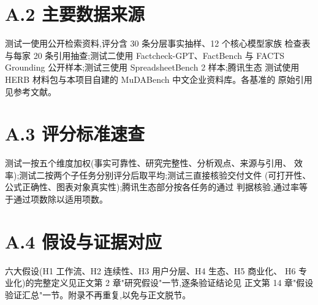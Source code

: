 \documentclass[
  12pt,
  a4paper,
  oneside,
  headings=normal,
  numbers=noendperiod,
  listof=totoc,
  bibliography=totoc
]{scrreprt}
\begin{document}
  \section*{A.2 主要数据来源}
  测试一使用公开检索资料,评分含 30 条分层事实抽样、12 个核心模型家族
  检查表与每家 20 条引用抽查;测试二使用 Factcheck-GPT、FactBench 与
  FACTS Grounding 公开样本;测试三使用 SpreadsheetBench 2 样本;腾讯生态
  测试使用 HERB 材料包与本项目自建的 MuDABench 中文企业资料库。各基准的
  原始引用见参考文献。

  \section*{A.3 评分标准速查}
  测试一按五个维度加权(事实可靠性、研究完整性、分析观点、来源与引用、
  效率);测试二按两个子任务分别评分后取平均;测试三直接核验交付文件
  (可打开性、公式正确性、图表对象真实性);腾讯生态部分按各任务的通过
  判据核验,通过率等于通过项数除以适用项数。

  \section*{A.4 假设与证据对应}
  六大假设(H1 工作流、H2 连续性、H3 用户分层、H4 生态、H5 商业化、
  H6 专业化)的完整定义见正文第 2 章"研究假设"一节,逐条验证结论见
  正文第 14 章"假设验证汇总"一节。附录不再重复,以免与正文脱节。
\fi

\label{LastNumberedPage}
\clearpage
\pagestyle{empty}
\end{document}
